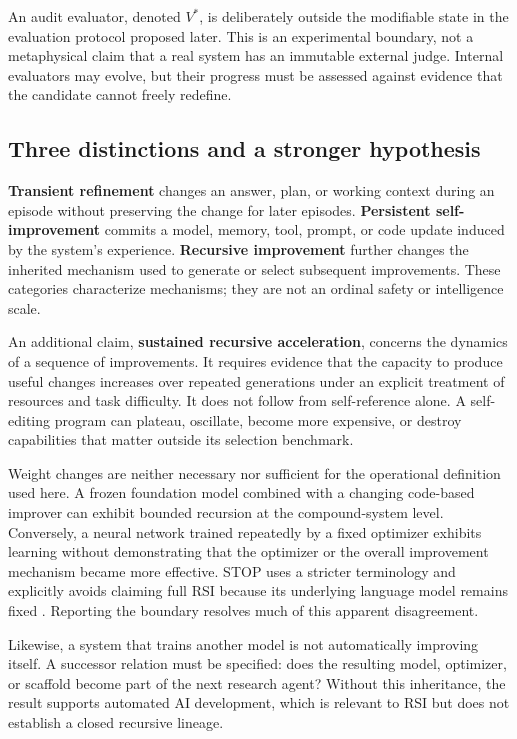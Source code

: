 \documentclass[11pt,american,]{article}
\begin{document}


An audit evaluator, denoted \(V^*\), is deliberately outside the
modifiable state in the evaluation protocol proposed later. This is an
experimental boundary, not a metaphysical claim that a real system has
an immutable external judge. Internal evaluators may evolve, but their
progress must be assessed against evidence that the candidate cannot
freely redefine.

\hypertarget{three-distinctions-and-a-stronger-hypothesis}{%
\subsection{Three distinctions and a stronger
hypothesis}\label{three-distinctions-and-a-stronger-hypothesis}}

\textbf{Transient refinement} changes an answer, plan, or working
context during an episode without preserving the change for later
episodes. \textbf{Persistent self-improvement} commits a model, memory,
tool, prompt, or code update induced by the system's experience.
\textbf{Recursive improvement} further changes the inherited mechanism
used to generate or select subsequent improvements. These categories
characterize mechanisms; they are not an ordinal safety or intelligence
scale.

An additional claim, \textbf{sustained recursive acceleration}, concerns
the dynamics of a sequence of improvements. It requires evidence that
the capacity to produce useful changes increases over repeated
generations under an explicit treatment of resources and task
difficulty. It does not follow from self-reference alone. A self-editing
program can plateau, oscillate, become more expensive, or destroy
capabilities that matter outside its selection benchmark.

Weight changes are neither necessary nor sufficient for the operational
definition used here. A frozen foundation model combined with a changing
code-based improver can exhibit bounded recursion at the compound-system
level. Conversely, a neural network trained repeatedly by a fixed
optimizer exhibits learning without demonstrating that the optimizer or
the overall improvement mechanism became more effective. STOP uses a
stricter terminology and explicitly avoids claiming full RSI because its
underlying language model remains fixed \citep{stop2023}. Reporting the
boundary resolves much of this apparent disagreement.

Likewise, a system that trains another model is not automatically
improving itself. A successor relation must be specified: does the
resulting model, optimizer, or scaffold become part of the next research
agent? Without this inheritance, the result supports automated AI
development, which is relevant to RSI but does not establish a closed
recursive lineage.
\end{document}
